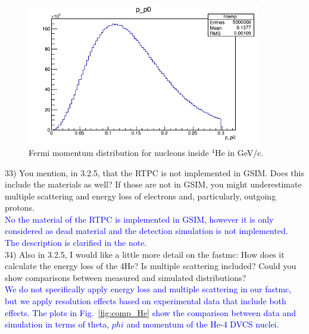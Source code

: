 \begin{figure}[tbp]
\centering
\includegraphics[height=6.2cm]{fig/fermi_momentum_dis.png}
\caption{Fermi momentum distribution for nucleons inside $^{4}$He in GeV/c.}
\label{fig:fermi_motion}
 \end{figure}

 
33) You mention, in 3.2.5, that the RTPC is not implemented in GSIM. Does this 
include the materials as well? If those are not in GSIM, you might 
underestimate multiple scattering and energy loss of electrons and, 
particularly, outgoing protons.\\
\textcolor{blue}{No the material of the RTPC is implemented in GSIM,
however it is only considered as dead material and the detection 
simulation is not implemented. The description is clarified in the
note.} \\


34) Also in 3.2.5, I would like a little more detail on the fastmc: How does it 
calculate the energy loss of the 4He? Is multiple scattering included? Could 
you show comparisons between measured and simulated distributions?\\
\textcolor{blue}{We do not specifically apply energy loss and multiple 
scattering in our fastmc, but we apply resolution effects based on 
experimental data that include both effects. The plots in Fig.~\ref{fig:comp_He} 
show the comparison between data and simulation in terms of theta, $phi$ and 
momentum of the He-4 DVCS nuclei.}\\

